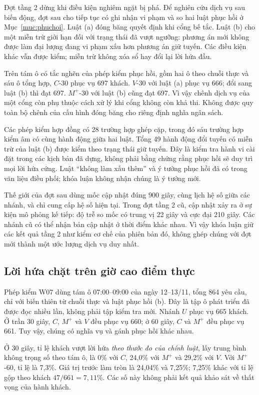 Đợt tầng 2 dừng khi điều kiện nghiêm ngặt bị phá. Để nghiên cứu dịch vụ sau biến
động, đợt sau cho tiếp tục có ghi nhận vi phạm và so hai luật phục hồi ở
Mục~\ref{muc:phuchoi}. Luật (a) đóng băng quyết định khi cổng bế tắc. Luật (b)
cho một miễn trừ giới hạn đối với trạng thái đã vượt ngưỡng: phương án mới không
được làm đại lượng đang vi phạm xấu hơn phương án giữ tuyến. Các điều kiện khác
vẫn được kiểm; miễn trừ không xóa sổ hay đổi lại lời hứa đầu.

Trên tám ô có tắc nghẽn của phép kiểm phục hồi, gồm hai ô theo chuỗi thực và sáu
ô tổng hợp, $C$-30 phục vụ 697 khách. $V$-30 với luật (a) phục vụ 666; đổi sang
luật (b) thì đạt 697. $M^{+}$-30 với luật (b) cũng đạt 697. Vì vậy chênh dịch vụ
của một cổng còn phụ thuộc cách xử lý khi cổng không còn khả thi. Không được
quy toàn bộ chênh của cấu hình đóng băng cho riêng định nghĩa ngân sách.

Các phép kiểm hợp đồng có 28 trường hợp ghép cặp, trong đó sáu trường hợp kiểm
âm có cùng hành động giữa hai luật. Tổng 49 hành động đổi tuyến có miễn trừ của
luật (b) được kiểm theo trạng thái giữ tuyến. Đây là kiểm tra hành vi cài đặt
trong các kịch bản đã dựng, không phải bằng chứng rằng phục hồi sẽ duy trì mọi
lời hứa cứng. Luật ``không làm xấu thêm'' và ý tưởng phục hồi đã có trong văn
liệu điều phối; khóa luận không nhận chúng là ý tưởng mới.

Thế giới của đợt sau dùng mốc cập nhật đúng $900$ giây, cùng lịch hệ số giữa các
nhánh, và chỉ cung cấp hệ số hiện tại. Trong đợt tầng 2 cũ, cập nhật xảy ra ở
sự kiện mô phỏng kế tiếp: độ trễ so mốc có trung vị 22 giây và cực đại 210 giây.
Các nhánh cũ có thể nhận bản cập nhật ở thời điểm khác nhau. Vì vậy khóa luận
giữ các kết quả tầng 2 như kiểm cơ chế của phiên bản đó, không ghép chúng với
đợt mới thành một ước lượng dịch vụ duy nhất.

\subsection{Lời hứa chặt trên giờ cao điểm thực}


Phép kiểm W07 dùng tám ô 07:00--09:00 của ngày 12--13/11, tổng 864 yêu cầu,
chỉ với biến thiên từ chuỗi thực và luật phục hồi (b). Đây là tập ô phát triển
đã được đọc nhiều lần, không phải tập kiểm tra mới. Nhánh $U$ phục vụ 665 khách.
Ở trần 30 giây, $C$, $M^{+}$ và $V$ đều phục vụ 660; ở 60 giây, $C$ và
$M^{+}$ đều phục vụ 661. Tuy vậy, chúng có nghĩa vụ và gánh phục hồi khác nhau.

Ở 30 giây, tỉ lệ khách vượt lời hứa \emph{theo thước đo của chính luật}, lấy
trung bình không trọng số theo tám ô, là 0\% với $C$, 24,0\% với $M^{+}$ và
29,2\% với $V$. Với $M^{+}$-60, tỉ lệ là 7,3\%. Giá trị trước làm tròn là
24,04\% và 7,25\%; 7,25\% khác với tỉ lệ gộp theo khách $47/661=7{,}11\%$.
Các số này không phải kết quả khảo sát về thất vọng của hành khách.

